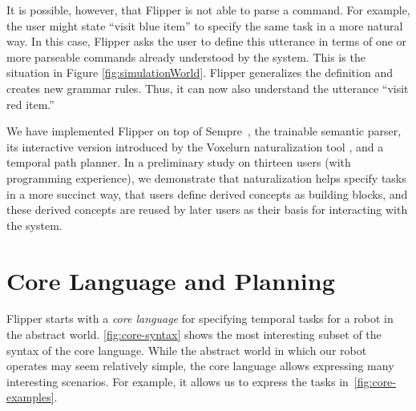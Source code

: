 \documentclass[letterpaper, 10 pt, conference]{ieeeconf}  %
\newcommand{\tool}{Flipper\xspace}
\begin{document}
It is possible, however, that \tool is not able to parse a command.
For example, the user might state ``visit blue item'' to specify the same task in a more natural way.
In this case, \tool asks the user to define this utterance
in terms of one or more parseable commands already understood by the system.
This is the situation in Figure \ref{fig:simulationWorld}.
\tool generalizes the definition and creates new grammar rules.
Thus, it can now also understand the utterance ``visit red item.''


We have implemented \tool on top of Sempre~\cite{berantSempre}, the trainable semantic parser, its interactive version introduced by the Voxelurn
naturalization tool \cite{wangVoxelurn}, and a temporal path planner.
In a preliminary study on thirteen users (with programming experience), we demonstrate that naturalization
helps specify tasks in a more succinct way, that users define derived concepts as building blocks,
and these derived concepts are reused by later users as their basis for interacting with the system.




\section{Core Language and Planning}
\label{sec:coreLanguage}

\tool starts with a \emph{core language} for specifying temporal tasks for a robot in
the abstract world.
\autoref{fig:core-syntax} shows the most interesting subset of the syntax
of the core language.
While the abstract world in which our robot operates may seem relatively simple,
the core language allows expressing many interesting scenarios.
For example, it allows us to express the tasks in~\autoref{fig:core-examples}.
\end{document}
